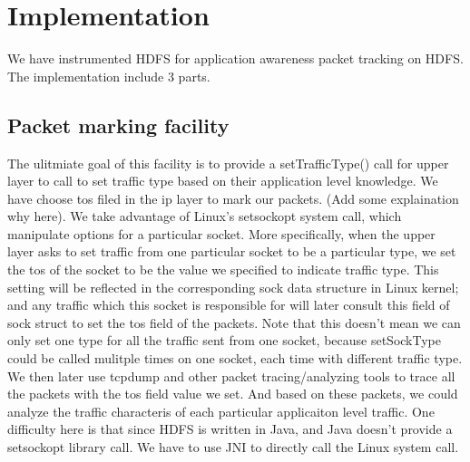 \section{Implementation}
\label{section:implementation}

We have instrumented HDFS for application awareness packet tracking on HDFS. The implementation include 3 parts. 

\subsection{Packet marking facility}
     The ulitmiate goal of this facility is to provide a setTrafficType() call for upper layer to call to set traffic type based on their application level knowledge. 
      We have choose tos filed in the ip layer  to mark our packets. (Add some explaination why here). We take advantage of Linux's setsockopt system call, which manipulate options for a particular socket. More specifically, when the upper layer asks to set traffic from one particular socket to be a particular type, we set the tos of the socket to be the value we specified to indicate traffic type. This setting will be reflected in the corresponding sock data structure in Linux kernel; and any traffic which this socket is responsible for will later consult this field of sock struct to set the tos field of the packets. Note that this doesn't mean we can only set one type for all the traffic sent from one socket, because setSockType could be called mulitple times on one socket, each time with different traffic type.
       We then later use tcpdump and other packet tracing/analyzing tools to trace all the packets with the tos field value we set. And based on these packets, we could analyze the traffic characteris of each particular applicaiton level traffic. 
        One difficulty here is that since HDFS is written in Java, and Java doesn't provide a setsockopt library call. We have to use JNI to directly call the Linux system call. 

